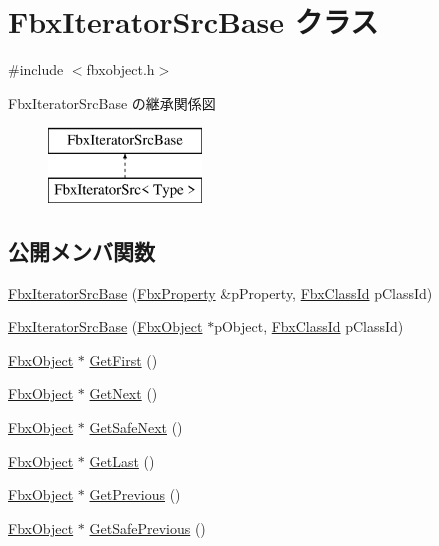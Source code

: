 \hypertarget{class_fbx_iterator_src_base}{}\section{Fbx\+Iterator\+Src\+Base クラス}
\label{class_fbx_iterator_src_base}


{\ttfamily \#include $<$fbxobject.\+h$>$}

Fbx\+Iterator\+Src\+Base の継承関係図\begin{figure}[H]
\begin{center}
\leavevmode
\includegraphics[height=2.000000cm]{class_fbx_iterator_src_base}
\end{center}
\end{figure}
\subsection*{公開メンバ関数}
\begin{DoxyCompactItemize}
\item 
\hyperlink{class_fbx_iterator_src_base_a98ce94a7c69a7e7bac6e01901a0a7500}{Fbx\+Iterator\+Src\+Base} (\hyperlink{class_fbx_property}{Fbx\+Property} \&p\+Property, \hyperlink{class_fbx_class_id}{Fbx\+Class\+Id} p\+Class\+Id)
\item 
\hyperlink{class_fbx_iterator_src_base_a17e8eab0754f02a28ca18b0e176f1533}{Fbx\+Iterator\+Src\+Base} (\hyperlink{class_fbx_object}{Fbx\+Object} $\ast$p\+Object, \hyperlink{class_fbx_class_id}{Fbx\+Class\+Id} p\+Class\+Id)
\item 
\hyperlink{class_fbx_object}{Fbx\+Object} $\ast$ \hyperlink{class_fbx_iterator_src_base_a19eea19f9f5fe3e94cc4a9fc626404c4}{Get\+First} ()
\item 
\hyperlink{class_fbx_object}{Fbx\+Object} $\ast$ \hyperlink{class_fbx_iterator_src_base_a640019fa81262dd57ac07bba9efc47e6}{Get\+Next} ()
\item 
\hyperlink{class_fbx_object}{Fbx\+Object} $\ast$ \hyperlink{class_fbx_iterator_src_base_ad0bb49ec584418f0325bc4f05a21ed04}{Get\+Safe\+Next} ()
\item 
\hyperlink{class_fbx_object}{Fbx\+Object} $\ast$ \hyperlink{class_fbx_iterator_src_base_a84d527f63d0b2953318bfcaac25b9b4a}{Get\+Last} ()
\item 
\hyperlink{class_fbx_object}{Fbx\+Object} $\ast$ \hyperlink{class_fbx_iterator_src_base_a953061817a99a4440f964ae584dcb0b5}{Get\+Previous} ()
\item 
\hyperlink{class_fbx_object}{Fbx\+Object} $\ast$ \hyperlink{class_fbx_iterator_src_base_a9ddd3ce318c6db15ec02ede17541f9ef}{Get\+Safe\+Previous} ()
\end{DoxyCompactItemize}
